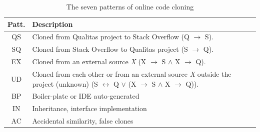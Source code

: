 \documentclass[10pt,journal,compsoc]{IEEEtran}
\begin{document}

\begin{table}
	\centering
	\caption{The seven patterns of online code cloning}
	\label{tab:classification_scheme}
	\begin{tabular}{c@{~~}p{7.35cm}}
		\toprule
		Patt. & Description \\ 
		\midrule
		QS & Cloned from Qualitas project to Stack Overflow (Q $\rightarrow$ S). \\ 
		
		SQ &Cloned from Stack Overflow to Qualitas project (S $\rightarrow$ Q). \\ 
		
		EX & Cloned from an external source \textit{X} (X $\rightarrow$ S $\wedge$ X $\rightarrow$ Q). \\
		
		UD & Cloned from each other or from an external source \textit{X} outside the project (unknown) (S $\leftrightarrow$ Q $\vee$ (X $\rightarrow$ S $\wedge$ X $\rightarrow$ Q)). \\ 
		\midrule
		BP & Boiler-plate or IDE auto-generated \\ 
		
		IN & Inheritance, interface implementation  \\ 
		
		AC & Accidental similarity, false clones \\ 
		\bottomrule 
	\end{tabular}  %
\end{table}
\end{document}
